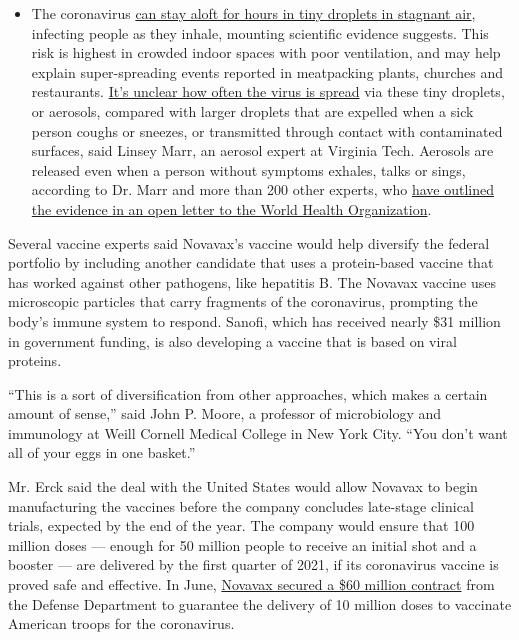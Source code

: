 \begin{itemize}
  \begin{itemize}
  \tightlist
  \item
    The coronavirus
    \href{https://www.nytimes3xbfgragh.onion/2020/07/04/health/239-experts-with-one-big-claim-the-coronavirus-is-airborne.html?action=click\&pgtype=Article\&state=default\&region=MAIN_CONTENT_3\&context=storylines_faq}{can
    stay aloft for hours in tiny droplets in stagnant air}, infecting
    people as they inhale, mounting scientific evidence suggests. This
    risk is highest in crowded indoor spaces with poor ventilation, and
    may help explain super-spreading events reported in meatpacking
    plants, churches and restaurants.
    \href{https://www.nytimes3xbfgragh.onion/2020/07/06/health/coronavirus-airborne-aerosols.html?action=click\&pgtype=Article\&state=default\&region=MAIN_CONTENT_3\&context=storylines_faq}{It's
    unclear how often the virus is spread} via these tiny droplets, or
    aerosols, compared with larger droplets that are expelled when a
    sick person coughs or sneezes, or transmitted through contact with
    contaminated surfaces, said Linsey Marr, an aerosol expert at
    Virginia Tech. Aerosols are released even when a person without
    symptoms exhales, talks or sings, according to Dr. Marr and more
    than 200 other experts, who
    \href{https://academic.oup.com/cid/article/doi/10.1093/cid/ciaa939/5867798}{have
    outlined the evidence in an open letter to the World Health
    Organization}.
  \end{itemize}
\end{itemize}

Several vaccine experts said Novavax's vaccine would help diversify the
federal portfolio by including another candidate that uses a
protein-based vaccine that has worked against other pathogens, like
hepatitis B. The Novavax vaccine uses microscopic particles that carry
fragments of the coronavirus, prompting the body's immune system to
respond. Sanofi, which has received nearly \$31 million in government
funding, is also developing a vaccine that is based on viral proteins.

``This is a sort of diversification from other approaches, which makes a
certain amount of sense,'' said John P. Moore, a professor of
microbiology and immunology at Weill Cornell Medical College in New York
City. ``You don't want all of your eggs in one basket.''

Mr. Erck said the deal with the United States would allow Novavax to
begin manufacturing the vaccines before the company concludes late-stage
clinical trials, expected by the end of the year. The company would
ensure that 100 million doses --- enough for 50 million people to
receive an initial shot and a booster --- are delivered by the first
quarter of 2021, if its coronavirus vaccine is proved safe and
effective. In June,
\href{https://ir.novavax.com/news-releases/news-release-details/novavax-awarded-department-defense-contract-covid-19-vaccine}{Novavax
secured a \$60 million contract} from the Defense Department to
guarantee the delivery of 10 million doses to vaccinate American troops
for the coronavirus.

